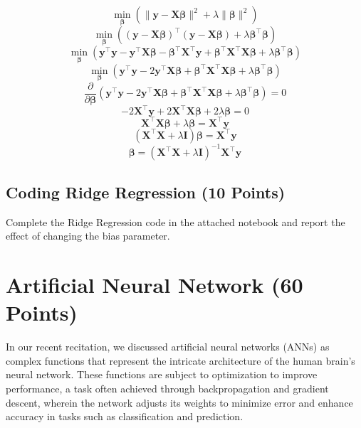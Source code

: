 \documentclass{article}
\begin{document}
\[
\min_{\boldsymbol{\beta}} \left( \|\mathbf{y} - \mathbf{X} \boldsymbol{\beta}\|^2 + \lambda \|\boldsymbol{\beta}\|^2 \right)
\]
\[
\min_{\boldsymbol{\beta}} \left( (\mathbf{y} - \mathbf{X} \boldsymbol{\beta})^\top (\mathbf{y} - \mathbf{X} \boldsymbol{\beta}) + \lambda \boldsymbol{\beta}^\top \boldsymbol{\beta} \right)
\]
\[
\min_{\boldsymbol{\beta}} \left( \mathbf{y}^\top \mathbf{y} - \mathbf{y}^\top \mathbf{X} \boldsymbol{\beta} - \boldsymbol{\beta}^\top \mathbf{X}^\top \mathbf{y} + \boldsymbol{\beta}^\top \mathbf{X}^\top \mathbf{X} \boldsymbol{\beta} + \lambda \boldsymbol{\beta}^\top \boldsymbol{\beta} \right)
\]
\[
\min_{\boldsymbol{\beta}} \left( \mathbf{y}^\top \mathbf{y} - 2 \mathbf{y}^\top \mathbf{X} \boldsymbol{\beta} + \boldsymbol{\beta}^\top \mathbf{X}^\top \mathbf{X} \boldsymbol{\beta} + \lambda \boldsymbol{\beta}^\top \boldsymbol{\beta} \right)
\]
\[
\frac{\partial}{\partial \boldsymbol{\beta}} \left( \mathbf{y}^\top \mathbf{y} - 2 \mathbf{y}^\top \mathbf{X} \boldsymbol{\beta} + \boldsymbol{\beta}^\top \mathbf{X}^\top \mathbf{X} \boldsymbol{\beta} + \lambda \boldsymbol{\beta}^\top \boldsymbol{\beta} \right) = 0
\]
\[
-2 \mathbf{X}^\top \mathbf{y} + 2 \mathbf{X}^\top \mathbf{X} \boldsymbol{\beta} + 2 \lambda \boldsymbol{\beta} = 0
\]
\[
\mathbf{X}^\top \mathbf{X} \boldsymbol{\beta} + \lambda \boldsymbol{\beta} = \mathbf{X}^\top \mathbf{y}
\]
\[
(\mathbf{X}^\top \mathbf{X} + \lambda \mathbf{I}) \boldsymbol{\beta} = \mathbf{X}^\top \mathbf{y}
\]
\[
\boldsymbol{\beta} = (\mathbf{X}^\top \mathbf{X} + \lambda \mathbf{I})^{-1} \mathbf{X}^\top \mathbf{y}
\]

\subsection{Coding Ridge Regression (10 Points)}
Complete the Ridge Regression code in the attached notebook and report the effect of changing the bias parameter.

\section{Artificial Neural Network (60 Points)}
In our recent recitation, we discussed artificial neural networks (ANNs) as complex functions that represent the intricate architecture of the human brain’s neural network. These functions are subject to optimization to improve performance, a task often achieved through backpropagation and gradient descent, wherein the network adjusts its weights to minimize error and enhance accuracy in tasks such as classification and prediction.
\end{document}
